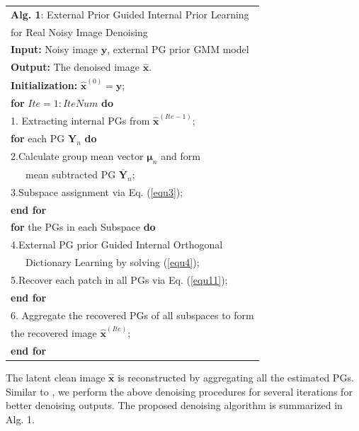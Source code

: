 \documentclass[10pt,twocolumn,letterpaper]{article}
\begin{document}
\begin{table}\label{alg1}
\begin{tabular}{l}
\hline
\textbf{Alg. 1}: External Prior Guided Internal Prior Learning
\\
\quad \quad \quad for Real Noisy Image Denoising
\\
\hline
\textbf{Input:} Noisy image $\mathbf{y}$, external PG prior GMM model
\\
\textbf{Output:} The denoised image $\hat{\mathbf{x}}$.
\\
\textbf{Initialization:} $\hat{\mathbf{x}}^{(0)}=\mathbf{y}$;
\\
\textbf{for} $Ite = 1:IteNum$ \textbf{do}
\\
1. Extracting internal PGs from $\hat{\mathbf{x}}^{(Ite-1)}$;
\\
\quad\textbf{for} each PG $\mathbf{Y}_{n}$ \textbf{do}
\\
2.\quad Calculate group mean vector $\bm{\mu}_{n}$ and form 
\\
\quad \ \ \ mean subtracted PG $\mathbf{\overline{Y}}_{n}$;
\\
3.\quad Subspace assignment via Eq. (\ref{equ3});
\\
\quad\textbf{end for}
\\
\quad\textbf{for} the PGs in each Subspace \textbf{do}
\\
4.\quad External PG prior Guided Internal Orthogonal
\\
\quad \ \ \ Dictionary Learning by solving (\ref{equ4});
\\
5.\quad Recover each patch in all PGs via Eq. (\ref{equ11});
\\
\quad\textbf{end for}
\\
6. Aggregate the recovered PGs of all subspaces to form
\\
\quad the recovered image $\hat{\mathbf{x}}^{(Ite)}$;
\\
\textbf{end for}
\\
\hline
\end{tabular}
\end{table}
The latent clean image $\hat{\mathbf{x}}$ is reconstructed by aggregating all the estimated PGs. Similar to \cite{pgpd}, we perform the above denoising procedures for several iterations for better denoising outputs. The proposed denoising algorithm is summarized in Alg. 1.
\end{document}
